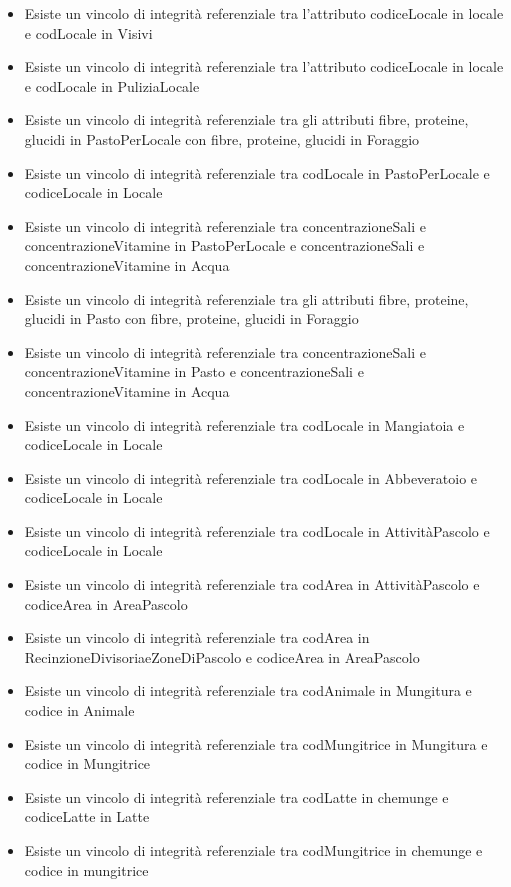 \documentclass[12pt,a4paper]{article}
\begin{document}
\begin{itemize}
   \item Esiste un vincolo di integrità referenziale tra l'attributo codiceLocale in locale e codLocale in Visivi
   \item Esiste un vincolo di integrità referenziale tra l'attributo codiceLocale in locale e codLocale in PuliziaLocale 
   \item Esiste un vincolo di integrità referenziale tra gli attributi fibre, proteine, glucidi in PastoPerLocale con fibre, proteine, glucidi in Foraggio
   \item Esiste un vincolo di integrità referenziale tra codLocale in PastoPerLocale e codiceLocale in Locale
   \item Esiste un vincolo di integrità referenziale tra concentrazioneSali e concentrazioneVitamine in PastoPerLocale e concentrazioneSali e concentrazioneVitamine in Acqua  
   \item Esiste un vincolo di integrità referenziale tra gli attributi fibre, proteine, glucidi in Pasto con fibre, proteine, glucidi in Foraggio
   \item Esiste un vincolo di integrità referenziale tra concentrazioneSali e concentrazioneVitamine in Pasto e concentrazioneSali e concentrazioneVitamine in Acqua
   \item Esiste un vincolo di integrità referenziale tra codLocale in Mangiatoia e codiceLocale in Locale
   \item Esiste un vincolo di integrità referenziale tra codLocale in Abbeveratoio e codiceLocale in Locale
   \item Esiste un vincolo di integrità referenziale tra codLocale in AttivitàPascolo e codiceLocale in Locale
   \item Esiste un vincolo di integrità referenziale tra codArea in AttivitàPascolo e codiceArea in AreaPascolo
   \item Esiste un vincolo di integrità referenziale tra codArea in RecinzioneDivisoriaeZoneDiPascolo e codiceArea in AreaPascolo
   \item Esiste un vincolo di integrità referenziale tra codAnimale in Mungitura e codice in Animale
   \item Esiste un vincolo di integrità referenziale tra codMungitrice in Mungitura e codice in Mungitrice
   \item Esiste un vincolo di integrità referenziale tra codLatte in chemunge e codiceLatte in Latte
   \item Esiste un vincolo di integrità referenziale tra codMungitrice in chemunge e codice in mungitrice

\end{itemize}
\end{document}
